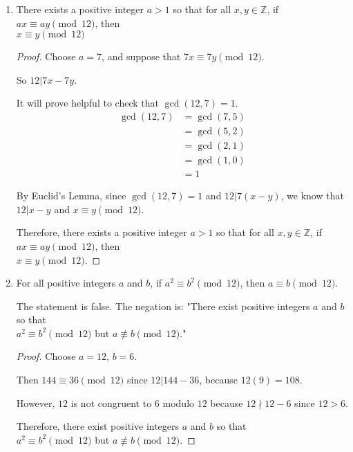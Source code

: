 \documentclass[]{article}
\begin{document}
\begin{enumerate}
\begin{enumerate}[label= (\alph*)]
        \item There exists a positive integer $a>1$ so that for all $x,y\in\mathbb{Z}$, 
        if $ax\equiv ay\pmod{12}$, then \\$x\equiv y\pmod{12}$

        \begin{proof}
            Choose $a=7$, and suppose that $7x\equiv 7y\pmod{12}$.

            So $12|7x-7y$.

            It will prove helpful to check that $\gcd(12,7)=1$.
            \begin{align*} 
                \gcd(12,7)&=\gcd(7,5)\\
                &=\gcd(5,2)\\
                &=\gcd(2,1)\\
                &=\gcd(1,0)\\
                &=1
            \end{align*}

            By Euclid's Lemma, since $\gcd(12,7)=1$ and $12|7(x-y)$, we know that
            $12|x-y$ and $x\equiv y\pmod{12}$.

            Therefore, there exists a positive integer $a>1$ so that for all $x,y\in\mathbb{Z}$, 
            if $ax\equiv ay\pmod{12}$, then \\$x\equiv y\pmod{12}$.
        \end{proof}
        
        \item For all positive integers $a$ and $b$, if $a^2\equiv b^2\pmod{12}$,
        then $a\equiv b\pmod{12}$.

        The statement is false. The negation is: 
        "There exist positive integers $a$ and $b$ so that \\ $a^2\equiv b^2\pmod{12}$
        but $a\not\equiv b\pmod{12}$."

        \begin{proof}
            Choose $a=12$, $b=6$.

            Then $144\equiv36\pmod{12}$ since $12|144-36$, because
            $12(9)=108$.

            However, $12$ is not congruent to $6$ modulo $12$ because
            $12\nmid12-6$ since $12>6$.
            
            Therefore, there exist positive integers $a$ and $b$ so that \\ $a^2\equiv b^2\pmod{12}$
            but $a\not\equiv b\pmod{12}$.
        \end{proof}

        \end{enumerate}


    \end{enumerate}
\end{document}
